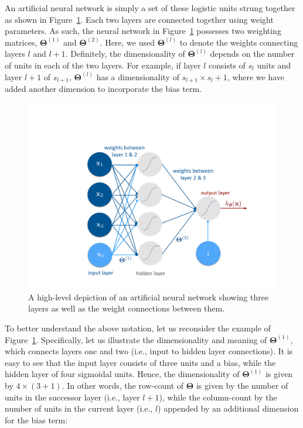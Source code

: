 An artificial neural network is simply a set of these logistic units strung together as shown in Figure~\ref{Fig:FigTwo}. Each two layers are connected together using weight parameters. As such, the neural network in Figure~\ref{Fig:FigTwo} possesses two weighting matrices, $\bm{\Theta}^{(1)}$ and $\bm{\Theta}^{(2)}$. Here, we used $\bm{\Theta}^{(l)}$ to denote the weights connecting layers $l$ and $l+1$. Definitely, the dimensionality of $\bm{\Theta}^{(l)}$ depends on the number of units in each of the two layers. For example, if layer $l$ consists of $s_{l}$ units and layer $l+1$ of $s_{l+1}$, $\bm{\Theta}^{(l)}$ has a dimensionality of $s_{l+1} \times s_{l} +1$, where we have added another dimension to incorporate the bias term. 

\begin{figure}[h!]
\label{Fig:FigTwo}
\centering 
\includegraphics[trim = 10em 1em 10em 10em, clip, scale=.3]{NN}
\caption{A high-level depiction of an artificial neural network showing three layers as well as the weight connections between them.}
\end{figure}
To better understand the above notation, let us reconsider the example of Figure~\ref{Fig:FigTwo}. Specifically, let us illustrate the dimensionality and meaning of $\bm{\Theta}^{(1)}$, which connects layers one and two (i.e., input to hidden layer connections). It is easy to see that the input layer consists of three units and a bias, while the hidden layer of four sigmoidal units. Hence, the dimensionality of $\bm{\Theta}^{(1)}$ is given by $4 \times (3+1)$. In other words, the row-count of $\bm{\Theta}$ is given by the number of units in the successor layer (i.e., layer $l+1$), while the column-count by the number of units in the current layer (i.e., $l$) appended by an additional dimension for the bias term:
